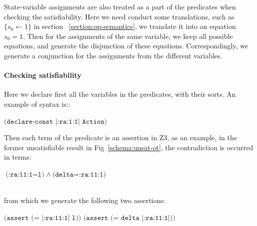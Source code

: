 \documentclass{lncs/llncs}
\newcommand{\TODO}[1]{\textcolor{red}{\textbf{[TODO:#1]}}}
\newcommand{\OTvar}{\texttt}
\newcommand{\OTland}{\;\land\ }
\begin{document}

State-variable assignments are also treated as a part of the
predicates when checking the satisfiability. Here we need conduct some
translations, such as $\{s_0 \leftarrow 1\}$ in section
~\ref{section:op-semantics}, we translate it into an equation
$s_0=1$. Then for the assignments of the same variable, we keep all
possible equations, and generate the disjunction of
these equations. Correspondingly, we generate a conjunction for the
assignments from the different variables. 


\paragraph{Checking satisfiability}

Here we declare first all the variables in the predicates, with their
sorts.
An example of syntax is::\\
\centerline{$\OTvar{(declare-const\ |:ra:1:1|\ Action)}$}

\noindent Then each term of the
predicate is an assertion in Z3, as an example, in the former
unsatisfiable result in Fig~\ref{schema:unsat-ot}, the contradiction is occurred in terms: \\
\centerline{$\OTvar{(:ra:11:1=l)} \OTland \OTvar{(delta=:ra:11:1)}$}\\
from which we generate the following two assertions:\\
\centerline{$\OTvar{(assert\ (=\ |:ra:11:1|\ l))\ \ \ (assert\ (=\ delta\ |:ra:11:1|))}$}
\end{document}
